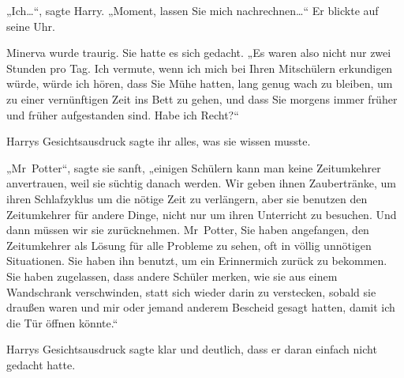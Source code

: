 „Ich…“, sagte Harry. „Moment, lassen Sie mich nachrechnen…“ Er blickte auf seine Uhr.

Minerva wurde traurig. Sie hatte es sich gedacht. „Es waren also nicht nur zwei Stunden pro Tag. Ich vermute, wenn ich mich bei Ihren Mitschülern erkundigen würde, würde ich hören, dass Sie Mühe hatten, lang genug wach zu bleiben, um zu einer vernünftigen Zeit ins Bett zu gehen, und dass Sie morgens immer früher und früher aufgestanden sind. Habe ich Recht?“

Harrys Gesichtsausdruck sagte ihr alles, was sie wissen musste.

„Mr~Potter“, sagte sie sanft, „einigen Schülern kann man keine Zeitumkehrer anvertrauen, weil sie süchtig danach werden. Wir geben ihnen Zaubertränke, um ihren Schlafzyklus um die nötige Zeit zu verlängern, aber sie benutzen den Zeitumkehrer für andere Dinge, nicht nur um ihren Unterricht zu besuchen. Und dann müssen wir sie zurücknehmen. Mr~Potter, Sie haben angefangen, den Zeitumkehrer als Lösung für alle Probleme zu sehen, oft in völlig unnötigen Situationen. Sie haben ihn benutzt, um ein Erinnermich zurück zu bekommen. Sie haben zugelassen, dass andere Schüler merken, wie sie aus einem Wandschrank verschwinden, statt sich wieder darin zu verstecken, sobald sie draußen waren und mir oder jemand anderem Bescheid gesagt hatten, damit ich die Tür öffnen könnte.“

Harrys Gesichtsausdruck sagte klar und deutlich, dass er daran einfach nicht gedacht hatte.

